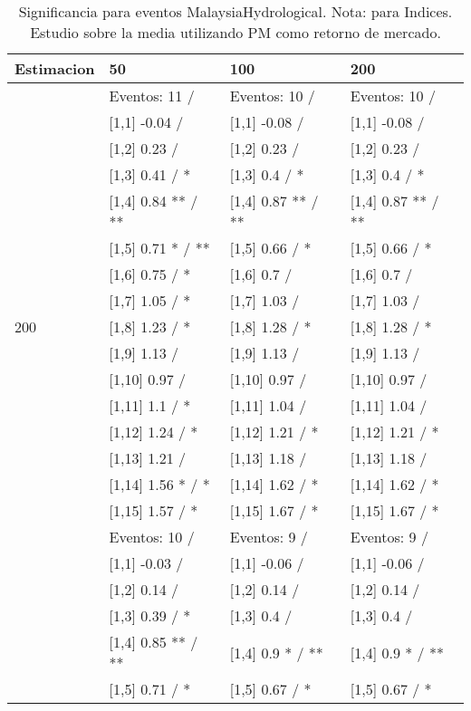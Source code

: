 \begin{table}

\caption{Significancia para eventos MalaysiaHydrological. Nota: para Indices. Estudio sobre la media utilizando PM como retorno de mercado.}
\centering
\begin{tabular}[t]{llll}
\toprule
Estimacion & 50 & 100 & 200\\
\midrule
 & Eventos:  11 / & Eventos:  10 / & Eventos:  10 /\\
 & {}[1,1] -0.04  / & {}[1,1] -0.08  / & {}[1,1] -0.08  /\\
 & {}[1,2] 0.23  / & {}[1,2] 0.23  / & {}[1,2] 0.23  /\\
 & {}[1,3] 0.41  / * & {}[1,3] 0.4  / * & {}[1,3] 0.4  / *\\
 & {}[1,4] 0.84 ** / ** & {}[1,4] 0.87 ** / ** & {}[1,4] 0.87 ** / **\\
\addlinespace
 & {}[1,5] 0.71 * / ** & {}[1,5] 0.66  / * & {}[1,5] 0.66  / *\\
 & {}[1,6] 0.75  / * & {}[1,6] 0.7  / & {}[1,6] 0.7  /\\
 & {}[1,7] 1.05  / * & {}[1,7] 1.03  / & {}[1,7] 1.03  /\\
200 & {}[1,8] 1.23  / * & {}[1,8] 1.28  / * & {}[1,8] 1.28  / *\\
 & {}[1,9] 1.13  / & {}[1,9] 1.13  / & {}[1,9] 1.13  /\\
\addlinespace
 & {}[1,10] 0.97  / & {}[1,10] 0.97  / & {}[1,10] 0.97  /\\
 & {}[1,11] 1.1  / * & {}[1,11] 1.04  / & {}[1,11] 1.04  /\\
 & {}[1,12] 1.24  / * & {}[1,12] 1.21  / * & {}[1,12] 1.21  / *\\
 & {}[1,13] 1.21  / & {}[1,13] 1.18  / & {}[1,13] 1.18  /\\
 & {}[1,14] 1.56 * / * & {}[1,14] 1.62  / * & {}[1,14] 1.62  / *\\
\addlinespace
 & {}[1,15] 1.57  / * & {}[1,15] 1.67  / * & {}[1,15] 1.67  / *\\
 & Eventos:  10 / & Eventos:  9 / & Eventos:  9 /\\
 & {}[1,1] -0.03  / & {}[1,1] -0.06  / & {}[1,1] -0.06  /\\
 & {}[1,2] 0.14  / & {}[1,2] 0.14  / & {}[1,2] 0.14  /\\
 & {}[1,3] 0.39  / * & {}[1,3] 0.4  / & {}[1,3] 0.4  /\\
\addlinespace
 & {}[1,4] 0.85 ** / ** & {}[1,4] 0.9 * / ** & {}[1,4] 0.9 * / **\\
 & {}[1,5] 0.71  / * & {}[1,5] 0.67  / * & {}[1,5] 0.67  / *\\

\end{tabular}
\end{table}
